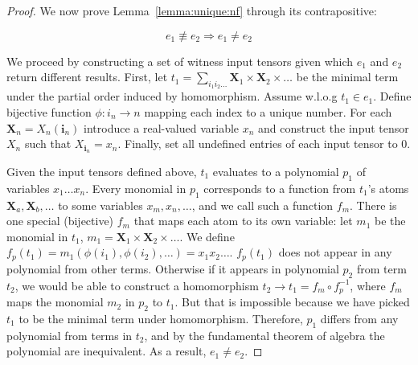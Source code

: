 \documentclass{article}
\begin{document}
\begin{proof}
We now prove Lemma~\ref{lemma:unique:nf} through its contrapositive: 

$$e_1 \not \equiv e_2 \Rightarrow e_1 \not = e_2$$

We proceed by constructing a set of witness input tensors given which $e_1$ and $e_2$ return different results. First, let $t_1 = \sum_{i_1 i_2 \dots} \pmb{X}_1 \times \pmb{X}_2 \times \dots$ be the minimal term under the partial order induced by homomorphism. Assume w.l.o.g $t_1 \in e_1$. Define bijective function $\phi: i_n \rightarrow n$ mapping each index to a unique number. For each $\pmb{X}_n = X_n(\pmb{i}_n)$ introduce a real-valued variable $x_{n}$ and construct the input tensor $X_n$ such that $X_{\pmb{i}_n} = x_n$. Finally, set all undefined entries of each input tensor to $0$. 

Given the input tensors defined above, $t_1$ evaluates to a polynomial $p_1$ of variables $x_1 \dots x_n$. Every monomial in $p_1$ corresponds to a function from $t_1$'s atoms $\pmb{X}_a, \pmb{X}_b, \dots$ to some variables $x_m, x_n, \dots$, and we call such a function $f_m$. There is one special (bijective) $f_m$ that maps each atom to its own variable: 
let $m_1$ be the monomial in $t_1$, $m_1 = \pmb{X}_1 \times \pmb{X}_2 \times \dots$. We define $f_p(t_1) = m_1(\phi(i_1), \phi(i_2), \dots) = x_1 x_2 \dots$. $f_p(t_1)$ does not appear in any polynomial from other terms. Otherwise if it appears in polynomial $p_2$ from term $t_2$, we would be able to construct a homomorphism
 $t_2 \rightarrow t_1 = f_m \circ f_p^{-1}$, where $f_m$ maps the monomial $m_2$ in $p_2$ to $t_1$. But that is impossible because we have picked $t_1$ to be the minimal term under homomorphism. Therefore, $p_1$ differs from any polynomial from terms in $t_2$, and by the fundamental theorem of algebra the polynomial are inequivalent. As a result, $e_1 \not = e_2$. 
\end{proof}{}
\end{document}
